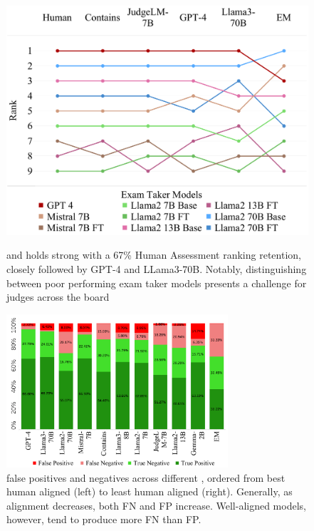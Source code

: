 \begin{figure}[h]
    \centering
    \begin{minipage}[b]{0.44\textwidth}
        \centering
        \includegraphics[width=\linewidth]{figures/RankOfEvaluationModels_V3.pdf}
        \caption{ and  holds strong with a 67\% Human Assessment ranking retention, closely followed by GPT-4 and LLama3-70B. Notably, distinguishing between poor performing exam taker models presents a challenge for judges across the board}
        \label{fig:rankcorrelation}
    \end{minipage}
    \hfill
    \begin{minipage}[b]{0.54\textwidth}
        \centering
        \includegraphics[width=\linewidth,height=5.7cm]{figures/ConfusionMatrixV4.pdf}
        \caption{false positives and negatives across different \judgemodels, ordered from best human aligned (left) to least human aligned (right). Generally, as alignment decreases, both FN and FP increase. Well-aligned models, however, tend to produce more FN than FP.
        }
        \label{fig:confusionmatrix}
    \end{minipage}
\end{figure}



